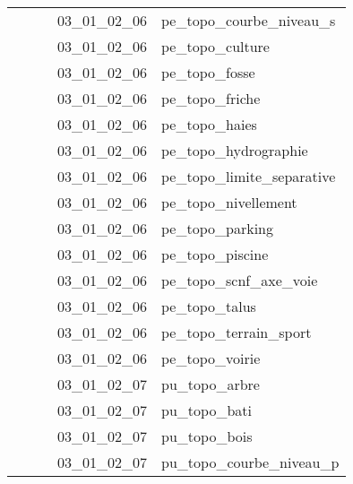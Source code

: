 \documentclass[12pt,titlepage,oneside]{book}
\begin{document}
\begin{supertabular}{|p{7.5cm}|p{7.5cm}|p{7.5cm}|c|p{10cm}|}
                   &                    &                    & 03\_01\_02\_06 & pe\_topo\_courbe\_niveau\_s\\
                   &                    &                    & 03\_01\_02\_06 & pe\_topo\_culture\\
                   &                    &                    & 03\_01\_02\_06 & pe\_topo\_fosse\\
                   &                    &                    & 03\_01\_02\_06 & pe\_topo\_friche\\
                   &                    &                    & 03\_01\_02\_06 & pe\_topo\_haies\\
                   &                    &                    & 03\_01\_02\_06 & pe\_topo\_hydrographie\\
                   &                    &                    & 03\_01\_02\_06 & pe\_topo\_limite\_separative\\
                   &                    &                    & 03\_01\_02\_06 & pe\_topo\_nivellement\\
                   &                    &                    & 03\_01\_02\_06 & pe\_topo\_parking\\
                   &                    &                    & 03\_01\_02\_06 & pe\_topo\_piscine\\
                   &                    &                    & 03\_01\_02\_06 & pe\_topo\_scnf\_axe\_voie\\
                   &                    &                    & 03\_01\_02\_06 & pe\_topo\_talus\\
                   &                    &                    & 03\_01\_02\_06 & pe\_topo\_terrain\_sport\\
                   &                    &                    & 03\_01\_02\_06 & pe\_topo\_voirie\\
                   &                    &                    & 03\_01\_02\_07 & pu\_topo\_arbre\\
                   &                    &                    & 03\_01\_02\_07 & pu\_topo\_bati\\
                   &                    &                    & 03\_01\_02\_07 & pu\_topo\_bois\\
                   &                    &                    & 03\_01\_02\_07 & pu\_topo\_courbe\_niveau\_p\\

\end{supertabular}
\end{document}
